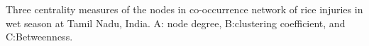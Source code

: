 Three centrality measures of the nodes in co-occurrence network of rice injuries in wet season at Tamil Nadu, India. A: node degree, B:clustering coefficient, and C:Betweenness.
        \label{fig:nodepropTM_ws}
